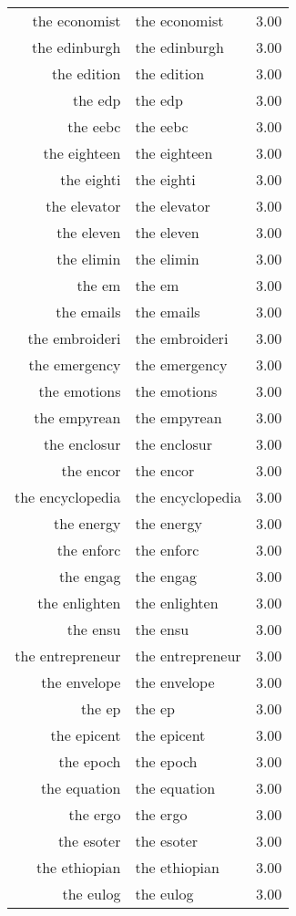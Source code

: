 \begin{table}[ht]
\begin{tabular}{rlr}
  the economist & the economist & 3.00 \\ 
  the edinburgh & the edinburgh & 3.00 \\ 
  the edition & the edition & 3.00 \\ 
  the edp & the edp & 3.00 \\ 
  the eebc & the eebc & 3.00 \\ 
  the eighteen & the eighteen & 3.00 \\ 
  the eighti & the eighti & 3.00 \\ 
  the elevator & the elevator & 3.00 \\ 
  the eleven & the eleven & 3.00 \\ 
  the elimin & the elimin & 3.00 \\ 
  the em & the em & 3.00 \\ 
  the emails & the emails & 3.00 \\ 
  the embroideri & the embroideri & 3.00 \\ 
  the emergency & the emergency & 3.00 \\ 
  the emotions & the emotions & 3.00 \\ 
  the empyrean & the empyrean & 3.00 \\ 
  the enclosur & the enclosur & 3.00 \\ 
  the encor & the encor & 3.00 \\ 
  the encyclopedia & the encyclopedia & 3.00 \\ 
  the energy & the energy & 3.00 \\ 
  the enforc & the enforc & 3.00 \\ 
  the engag & the engag & 3.00 \\ 
  the enlighten & the enlighten & 3.00 \\ 
  the ensu & the ensu & 3.00 \\ 
  the entrepreneur & the entrepreneur & 3.00 \\ 
  the envelope & the envelope & 3.00 \\ 
  the ep & the ep & 3.00 \\ 
  the epicent & the epicent & 3.00 \\ 
  the epoch & the epoch & 3.00 \\ 
  the equation & the equation & 3.00 \\ 
  the ergo & the ergo & 3.00 \\ 
  the esoter & the esoter & 3.00 \\ 
  the ethiopian & the ethiopian & 3.00 \\ 
  the eulog & the eulog & 3.00 \\ 

\end{tabular}
\end{table}
